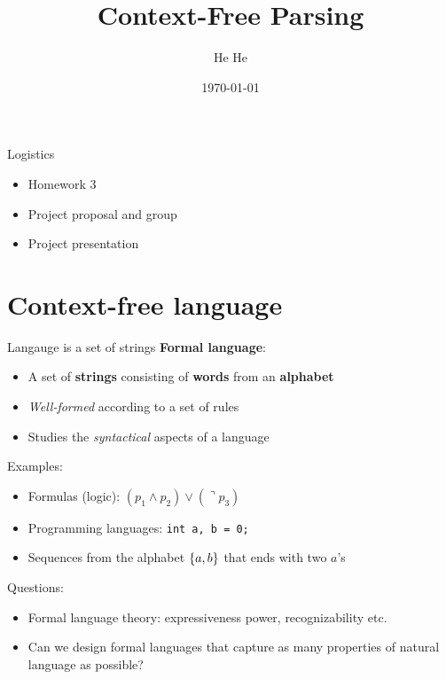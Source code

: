 \documentclass[usenames,dvipsnames,notes]{beamer}
\title[CSCI-GA.2590]{Context-Free Parsing}
\author[He He]{He He
}
\institute[NYU]{New York University}
\date{\today}
\begin{document}
\begin{frame}
\titlepage
\end{frame}

\begin{frame}
    {Logistics}
    \begin{itemize}
        \item Homework 3
        \item Project proposal and group
        \item Project presentation
    \end{itemize}
\end{frame}

\section{Context-free language}

\begin{frame}
    {Langauge is a set of strings}
    \textbf{Formal language}:\\
    \begin{itemize}
        \item A set of \textbf{strings} consisting of \textbf{words} from an \textbf{alphabet}
        \item \emph{Well-formed} according to a set of rules 
        \item Studies the \emph{syntactical} aspects of a language
    \end{itemize}

    Examples:\\
    \begin{itemize}
        \item Formulas (logic): $(p_1 \wedge p_2) \vee (\urcorner p_3)$
        \item Programming languages: \texttt{int a, b = 0;}
        \item Sequences from the alphabet $\left\{ a,b \right\}$ that ends with two $a$'s
    \end{itemize}

    Questions:\\
    \begin{itemize}
        \item Formal language theory: expressiveness power, recognizability etc.
        \item Can we design formal languages that capture as many properties of natural language as possible? 
    \end{itemize}
\end{frame}
\end{document}
